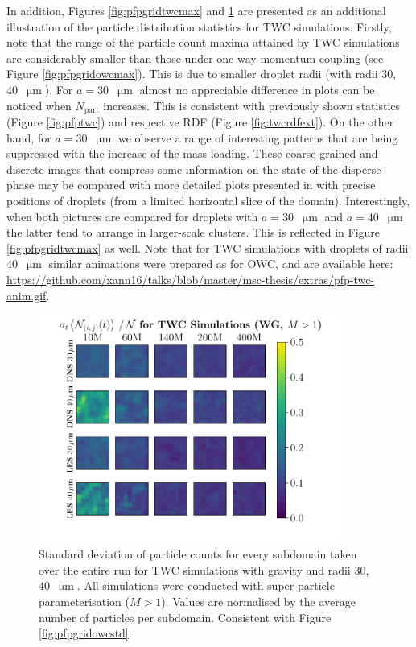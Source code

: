 \documentclass{pracamgren}
\begin{document}
\medskip

In addition, Figures \ref{fig:pfpgridtwcmax} and \ref{fig:pfpgridrdfstd} are presented as an additional illustration of the particle distribution statistics for TWC simulations.
Firstly, note that the range of the particle count maxima attained by TWC simulations are considerably smaller than those under one-way momentum coupling (see Figure \ref{fig:pfpgridowcmax}).
This is due to smaller droplet radii (with radii $30$,~$40$~$\upmu\text{m}$).
For $a = 30$~$\upmu\text{m}$ almost no appreciable difference in plots can be noticed when $N_{\text{part}}$ increases.
This is consistent with previously shown statistics (Figure \ref{fig:pfptwc}) and respective RDF (Figure \ref{fig:twcrdfext}).
On the other hand, for ${a = 30}$~$\upmu\text{m}$ we observe a range of interesting patterns that are being suppressed with the increase of the mass loading.
These coarse-grained and discrete images that compress some information on the state of the disperse phase may be compared with more detailed plots presented in \textcite[Figure 9bc]{Rosa2020} with precise positions of droplets (from a limited horizontal slice of the domain).
Interestingly, when both pictures are compared for droplets with ${a = 30}$~$\upmu\text{m}$ and ${a = 40}$~$\upmu\text{m}$ the latter tend to arrange in larger-scale clusters.
This is reflected in Figure \ref{fig:pfpgridtwcmax} as well.
Note that for TWC simulations with droplets of radii $40$~$\upmu\text{m}$ similar animations were prepared as for OWC, and are available here: \url{https://github.com/xann16/talks/blob/master/msc-thesis/extras/pfp-twc-anim.gif}.

\begin{figure}[ht]
\centering
\includegraphics[width=10cm]{figures/3-24_pfpgridrdfstd.pdf}
\caption{
Standard deviation of particle counts for every subdomain taken over the entire run for TWC simulations with gravity and radii $30$, $40$~$\upmu\text{m}$.
All simulations were conducted with super-particle parameterisation ($M>1$). 
Values are normalised by the average number of particles per subdomain.
Consistent with Figure \ref{fig:pfpgridowcstd}.
}
\label{fig:pfpgridrdfstd}
\end{figure}
\end{document}
